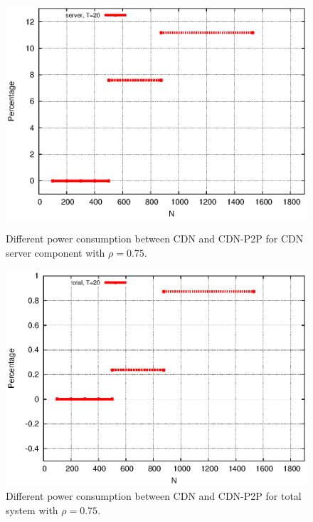 \documentclass[conference]{IEEEtran}
\begin{document}
\begin{figure}[ht!]
\centering
\begin{minipage}[b]{0.4\linewidth}
	\includegraphics[scale=0.5]{graphs/diff-3.eps}
	\caption{Different power consumption between CDN and CDN-P2P for CDN server component with $\rho=0.75$.}
	\label{fig:diffs1}
\end{minipage}
\hfill
\begin{minipage}[b]{0.4\linewidth}
	\includegraphics[scale=0.5]{graphs/diff-3-total.eps}
	\caption{Different power consumption between CDN and CDN-P2P for total system with $\rho=0.75$.}
	\label{fig:diffs2}
\end{minipage}
\label{fig:maindiff2}
\end{figure}
\end{document}
